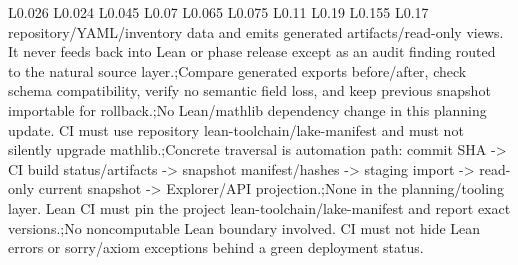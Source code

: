 \begin{longtable}{L{0.026\linewidth} L{0.024\linewidth} L{0.045\linewidth} L{0.07\linewidth} L{0.065\linewidth} L{0.075\linewidth} L{0.11\linewidth} L{0.19\linewidth} L{0.155\linewidth} L{0.17\linewidth}}
repository/\allowbreak{}YAML/\allowbreak{}inventory data and emits generated artifacts/\allowbreak{}read-only views. It never feeds back into Lean or phase release except as an audit finding routed to the natural source layer.;\newline Compare generated exports before/\allowbreak{}after, check schema compatibility, verify no semantic field loss, and keep previous snapshot importable for rollback.;\newline No Lean/\allowbreak{}mathlib dependency change in this planning update. CI must use repository lean-toolchain/\allowbreak{}lake-manifest and must not silently upgrade mathlib.;\newline Concrete traversal is automation path: commit SHA -> CI build status/\allowbreak{}artifacts -> snapshot manifest/\allowbreak{}hashes -> staging import -> read-only current snapshot -> Explorer/\allowbreak{}API projection.;\newline None in the planning/\allowbreak{}tooling layer. Lean CI must pin the project lean-toolchain/\allowbreak{}lake-manifest and report exact versions.;\newline No noncomputable Lean boundary involved. CI must not hide Lean errors or sorry/\allowbreak{}axiom exceptions behind a green deployment status.\\
\hline
\addlinespace[0.24em]

\end{longtable}
